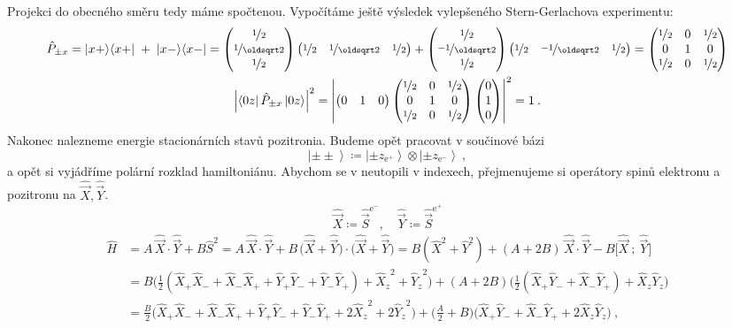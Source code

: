 \documentclass[10pt,a4paper]{article}
\newcommand{\const}[1]{\text{#1}}
\newcommand{\mat}[1]{
    \begin{pmatrix}
        #1
    \end{pmatrix}
}
\newcommand{\bra}[1]{\left< #1 \right|}
\newcommand{\ket}[1]{\left| #1 \right>}
\newcommand{\vechat}[1]{\hat{\vec{#1}}}
\begin{document}
Projekci do obecného směru tedy máme spočtenou. Vypočítáme ještě výsledek vylepšeného Stern-Gerlachova experimentu:
\begin{gather*}
    \hat P_{\pm x}
    = \ket{x+}\!\bra{x+} \;+\; \ket{x-}\!\bra{x-}
    = \mat{
        \nicefrac{1}{2} \\
        \nicefrac{1}{\oldsqrt 2} \\
        \nicefrac{1}{2}
    } \mat{
        \nicefrac{1}{2} &
        \nicefrac{1}{\oldsqrt 2} &
        \nicefrac{1}{2}
    }
    + \mat{
        \nicefrac{1}{2} \\
        \nicefrac{-1}{\oldsqrt 2} \\
        \nicefrac{1}{2}
    } \mat{
        \nicefrac{1}{2} &
        \nicefrac{-1}{\oldsqrt 2} &
        \nicefrac{1}{2}
    } = \mat{
        \nicefrac{1}{2} & 0 & \nicefrac{1}{2} \\
        0 & 1 & 0 \\
        \nicefrac{1}{2} & 0 & \nicefrac{1}{2}
    }
    \\
    \left| \bra{0z} \hat P_{\pm x} \ket{0z} \right|^2
    =
    \left|
        \mat{0 & 1 & 0}
        \mat{
            \nicefrac{1}{2} & 0 & \nicefrac{1}{2} \\
            0 & 1 & 0 \\
            \nicefrac{1}{2} & 0 & \nicefrac{1}{2}
        }
        \mat{0 \\ 1 \\ 0}
    \right|^2
    = 1
    \: .
\end{gather*}
Nakonec nalezneme energie stacionárních stavů pozitronia. Budeme opět pracovat v součinové bázi
\begin{equation*}
    \ket{\pm\pm} \coloneqq \ket{\pm z_{\const{e}^+}} \otimes \ket{\pm z_{\const{e}^-}} \: ,
\end{equation*}
a opět si vyjádříme polární  rozklad hamiltoniánu. Abychom se v neutopili v indexech, přejmenujeme si operátory spinů elektronu a pozitronu na $\vechat X, \vechat Y$.
\begin{equation*}
    \vechat X \coloneqq \vechat S^{\const{e}^-},
    \quad
    \vechat Y \coloneqq \vechat S^{\const{e}^+}
\end{equation*}
\begin{align*}
    \hat H
    &= A \, \vechat X \!\cdot \vechat Y
    + B \hat S^2
    =
    A \, \vechat X \!\cdot \vechat Y
    + B \, \big(\vechat X + \vechat Y\big) \cdot \big(\vechat X + \vechat Y\big)
    = B (\hat X^2 + \hat Y^2)
    + (A + 2B) \, \vechat X \! \cdot \vechat Y
    - B \big[ \vechat X \:{;}\: \vechat Y \big]
    \\[5pt]
    &= B \big(
        \frac{1}{2} (\hat X_+ \hat X_- + \hat X_- \hat X_+ + \hat Y_+ \hat Y_- + \hat Y_- \hat Y_+)
        + {\hat X_z}^2 + {\hat Y_z}^2
    \big)
    + (A + 2B)\big(
        \frac{1}{2} (\hat X_+ \hat Y_- + \hat X_- \hat Y_+) + \hat X_z \hat Y_z
    \big)
    \\[5pt]
    &= \frac{B}{2} \big(
        \hat X_+ \hat X_- + \hat X_- \hat X_+ + \hat Y_+ \hat Y_- + \hat Y_- \hat Y_+
        + 2 {\hat X_z}^2 + 2 {\hat Y_z}^2
    \big)
    + \big( \frac{A}{2} + B \big)\big(
        \hat X_+ \hat Y_- + \hat X_- \hat Y_+
        + 2 \hat X_z \hat Y_z
    \big)
    \: ,
\end{align*}
\end{document}
